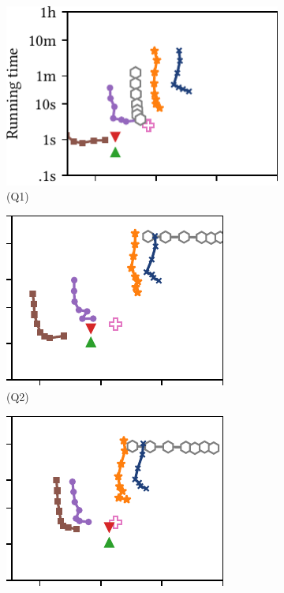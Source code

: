 \documentclass[sigconf,nonacm,natbib=false,screen]{acmart}
\newcommand{\queryref}[1]{(Q#1)\xspace}
\begin{document}
\begin{figure}
  \begin{subfigure}[t]{.245\linewidth}
    \includegraphics[scale=.7]{cost-running-time-tradeoff-1}%
    \hfill
    \vspace{-1ex}
    \caption{\queryref{1}\hspace{-2em}~}
    \label{fig:cost-running-time-tradeoff:1}
  \end{subfigure}
  \begin{subfigure}[t]{.2\linewidth}
    \includegraphics[scale=.7]{cost-running-time-tradeoff-2}%
    \hfill
    \vspace{-1ex}
    \caption{\queryref{2}\hspace{1em}~}
    \label{fig:cost-running-time-tradeoff:2}
  \end{subfigure}
  \begin{subfigure}[t]{.2\linewidth}
    \includegraphics[scale=.7]{cost-running-time-tradeoff-3}%

\end{subfigure}
\end{figure}
\end{document}
